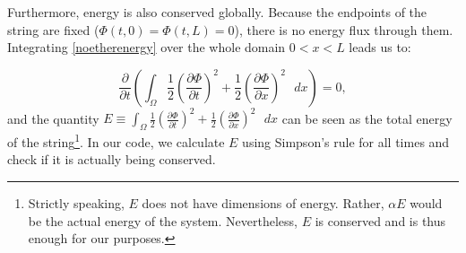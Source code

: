 \documentclass{article}
\begin{document}
Furthermore, energy is also conserved globally. Because the endpoints of the string are fixed ($\Phi(t,0)=\Phi(t,L)=0$), there is no energy flux through them. Integrating \eqref{noetherenergy} over the whole domain $0<x<L$ leads us to:

\begin{equation}\label{ENERGY}
\frac{\partial}{\partial t}\left(\int_\Omega\frac{1}{2}\left(\frac{\partial\Phi}{\partial t}\right)^2+\frac{1}{2}\left(\frac{\partial\Phi}{\partial x}\right)^2\text{ }dx\right)=0,
\end{equation}
and the quantity $E\equiv\int_\Omega\frac{1}{2}\left(\frac{\partial\Phi}{\partial t}\right)^2+\frac{1}{2}\left(\frac{\partial\Phi}{\partial x}\right)^2\text{ }dx$ can be seen as the total energy of the string\footnote{Strictly speaking, $E$ does not have dimensions of energy. Rather, $\alpha E$ would be the actual energy of the system. Nevertheless, $E$ is conserved and is thus enough for our purposes.}. In our code, we calculate $E$ using Simpson's rule for all times and check if it is actually being conserved.
\end{document}
